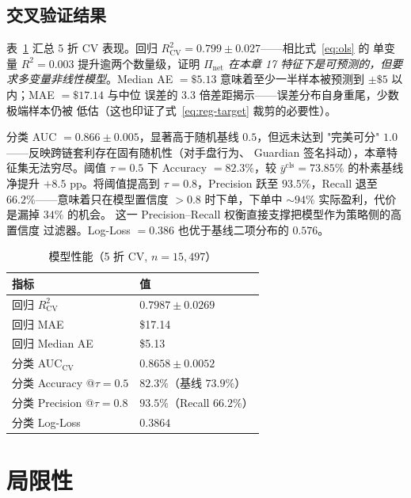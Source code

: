 \documentclass[sigconf,nonacm,10pt]{acmart}
\newcommand{\Pnet}{\Pi_{\text{net}}}
\begin{document}
\subsection{交叉验证结果}

表~\ref{tab:model} 汇总 5 折 CV 表现。回归
$R^2_{\text{CV}}=0.799\pm0.027$——相比式~\eqref{eq:ols} 的
单变量 $R^2=0.003$ 提升逾两个数量级，证明 \emph{$\Pnet$ 在本章
17 特征下是可预测的，但要求多变量非线性模型}。Median AE $=\$5.13$
意味着至少一半样本被预测到 $\pm\$5$ 以内；MAE $=\$17.14$ 与中位
误差的 $3.3$ 倍差距揭示——误差分布自身重尾，少数极端样本仍被
低估（这也印证了式~\eqref{eq:reg-target} 裁剪的必要性）。

分类 AUC $=0.866\pm0.005$，显著高于随机基线 $0.5$，但远未达到
"完美可分" $1.0$——反映跨链套利存在固有随机性（对手盘行为、
Guardian 签名抖动），本章特征集无法穷尽。阈值 $\tau=0.5$ 下
Accuracy $=82.3\%$，较 $\bar y^{\text{cls}}=73.85\%$ 的朴素基线
净提升 $+8.5$ pp。将阈值提高到 $\tau=0.8$，Precision 跃至
$93.5\%$，Recall 退至 $66.2\%$——意味着只在模型置信度 $>0.8$
时下单，下单中 $\sim\!94\%$ 实际盈利，代价是漏掉 $34\%$ 的机会。
这一 Precision--Recall 权衡直接支撑把模型作为策略侧的高置信度
过滤器。Log-Loss $=0.386$ 也优于基线二项分布的 $0.576$。

\begin{table}[h]
  \centering
  \small
  \caption{模型性能（5 折 CV, $n=15{,}497$）}
  \label{tab:model}
  \begin{tabular}{ll}
    \toprule
    \textbf{指标}                    & \textbf{值} \\
    \midrule
    回归 $R^2_{\text{CV}}$          & $0.7987 \pm 0.0269$ \\
    回归 MAE                         & \$17.14 \\
    回归 Median AE                   & \$5.13 \\
    分类 AUC$_{\text{CV}}$          & $0.8658 \pm 0.0052$ \\
    分类 Accuracy @$\tau=0.5$       & $82.3\%$（基线 $73.9\%$）\\
    分类 Precision @$\tau=0.8$      & $93.5\%$（Recall $66.2\%$）\\
    分类 Log-Loss                   & $0.3864$ \\
    \bottomrule
  \end{tabular}
\end{table}

\section{局限性}
\label{sec:limitations}
\end{document}

